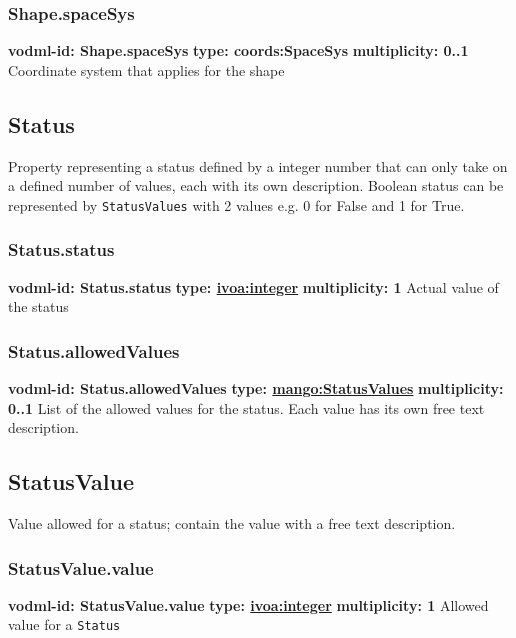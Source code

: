     \subsubsection{Shape.spaceSys}
      \textbf{vodml-id: Shape.spaceSys} \newline
      \textbf{type: coords:SpaceSys} \newline
      \textbf{multiplicity: 0..1} \newline
      Coordinate system that applies for the shape

  \subsection{Status}
  \label{sect:Status}
    Property representing a status defined by a integer number that can only take on a defined number of values, each with its own description. Boolean status can be represented by \texttt{StatusValues} with 2 values e.g. 0 for False and 1 for True.

    \subsubsection{Status.status}
      \textbf{vodml-id: Status.status} \newline
      \textbf{type: \hyperref[sect:ivoa]{ivoa:integer}} \newline
      \textbf{multiplicity: 1} \newline
      Actual value of the status

    \subsubsection{Status.allowedValues}
      \textbf{vodml-id: Status.allowedValues} \newline
      \textbf{type: \hyperref[sect:StatusValues]{mango:StatusValues}} \newline
      \textbf{multiplicity: 0..1} \newline
      List of the allowed values for the status. Each value has its own free text description.

  \subsection{StatusValue}
  \label{sect:StatusValue}
    Value allowed for a status; contain the value with a free text description.

    \subsubsection{StatusValue.value}
      \textbf{vodml-id: StatusValue.value} \newline
      \textbf{type: \hyperref[sect:ivoa]{ivoa:integer}} \newline
      \textbf{multiplicity: 1} \newline
      Allowed value for a \texttt{Status}

